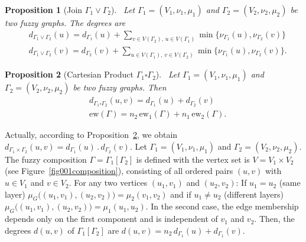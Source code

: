 \documentclass[12pt]{amsart}
\newtheorem{proposition}{Proposition}[section]
\newcommand{\ew}{\mathrm{ew}}
\begin{document}
\begin{proposition}[Join $\Gamma_1\vee \Gamma_2$]~\label{Unionfuzzy02}
Let $\Gamma_1=(V_1, \nu_1, \mu_1)$ and $\Gamma_2=(V_2, \nu_2, \mu_2)$ be two fuzzy graphs. The degrees are 
\begin{equation}~\label{eqq1Unionfuzzy02}
\begin{aligned}
&d_{\Gamma_1\vee \Gamma_2}(u)=d_{\Gamma_1}(u)+\sum_{v\in V(\Gamma_2), \, u\in V(\Gamma_1)}\min\{\nu_{\Gamma_1}(u),\nu_{\Gamma_2}(v) \}\\
&d_{\Gamma_1\vee \Gamma_2}(v)=d_{\Gamma_2}(v)+\sum_{u\in V(\Gamma_1), \,v\in V(\Gamma_2) }\min\{\nu_{\Gamma_1}(u),\nu_{\Gamma_2}(v) \}.
\end{aligned}
\end{equation}
\end{proposition}

\begin{proposition}[Cartesian Product $\Gamma_1\square \Gamma_2$]~\label{Unionfuzzy03}
Let $\Gamma_1=(V_1, \nu_1, \mu_1)$ and $\Gamma_2=(V_2, \nu_2, \mu_2)$ be two fuzzy graphs. Then
\begin{equation}~\label{eqq1Unionfuzzy03}
\begin{aligned}
&d_{\Gamma_1\square \Gamma_2}(u,v)=d_{\Gamma_1}(u)+d_{\Gamma_2}(v)\\
&\ew(\Gamma)=n_2\,\ew_1(\Gamma)+n_1\,\ew_2(\Gamma).
\end{aligned}
\end{equation}
\end{proposition}
Actually, according to Proposition~\ref{Unionfuzzy03}, we obtain $d_{\Gamma_1\times \Gamma_2}(u,v)=d_{\Gamma_1}(u)\,.\,d_{\Gamma_2}(v)$. 
Let $\Gamma_1 = (V_1, \nu_1, \mu_1)$ and $\Gamma_2 = (V_2, \nu_2, \mu_2)$.
The fuzzy composition $\Gamma= \Gamma_1[\Gamma_2]$ is defined with 
the vertex set is $V = V_1 \times V_2$ (see Figure~\ref{fig001composition}), consisting of all ordered pairs $(u, v)$ with $u \in V_1$ and $v \in V_2$. For any two vertices $(u_1, v_1)$ and $(u_2, v_2)$: If $u_1 = u_2$ (same layer) $\mu_G\bigl((u_1, v_1), (u_2, v_2)\bigr) = \mu_2(v_1, v_2)$ and if  $u_1 \ne u_2$ (different layers) $ \mu_G\bigl((u_1, v_1), (u_2, v_2)\bigr) = \mu_1(u_1, u_2)$. In the second case, the edge membership depends only on the first component and is independent of $v_1$ and $v_2$. 
Then, the degrees $d(u,v)$ of $\Gamma_1[\Gamma_2]$ are $d(u,v)=n_2\, d_{\Gamma_1}(u)+d_{\Gamma_1}(v)$. 
\end{document}

